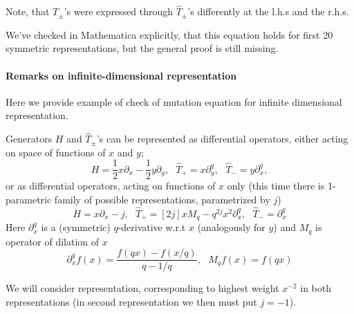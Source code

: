 \documentclass{article}
\newcommand {\?}{\textit{???}}
\newcommand{\hT}[0]{\hat{T}}
\begin{document}
Note, that $T_\pm$'s were expressed through $\hT_\pm$'s differently at the l.h.s and the r.h.s.

We've checked in Mathematica explicitly, that this equation holds for first 20 symmetric representations,
but the general proof is still missing.

\paragraph{Remarks on infinite-dimensional representation}
Here we provide example of check of mutation equation for infinite dimensional representation.

Generators $H$ and $\hT_\pm$'s can be represented as differential operators,
either acting on space of functions of $x$ and $y$;
\begin{equation}
\label{eq:sl2q-diff-hom-repr}
H = \frac{1}{2} x \partial_x - \frac{1}{2} y \partial_y,\ \ \ \hT_+ = x \partial^q_y,\ \ \ \hT_- = y \partial^q_x,
\end{equation}
or as differential operators, acting on functions of $x$ only (this time there is 1-parametric
family of possible representations, parametrized by $j$)
\begin{equation}
\label{eq:sl2q-diff-nonhom-repr}
H = x \partial_x - j,\ \ \ \hT_+ = [2 j] x M_q - q^{2j} x^2 \partial^q_x,\ \ \ \hT_- = \partial^q_x
\end{equation}
Here $\partial^q_x$ is a (symmetric) $q$-derivative w.r.t $x$ (analogously for $y$) and
$M_q$ is operator of dilation of $x$
\begin{equation}
\partial^q_x f(x) = \frac{f(qx) - f(x / q)}{q - 1/q},\ \ \ M_q f(x) = f(q x)
\end{equation}

We will consider representation, corresponding to highest weight $x^{-2}$ in both representations
(in second representation we then must put $j = -1$).
\end{document}
